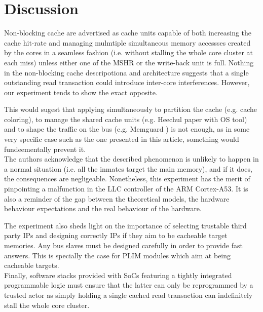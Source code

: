 \section{Discussion}
    Non-blocking cache are advertised as cache units capable of both increasing the cache hit-rate and managing mulmtiple simultaneous memory accessses created by the cores in a seamless fashion (i.e. without stalling the whole core cluster at each miss) unless either one of the MSHR or the write-back unit  is full. Nothing in the non-blocking cache descripotiona and architecture suggests that a single outstanding read transaction could introduce inter-core interferences. However, our experiment tends to show the exact opposite.

    This would sugest that applying simultaneously to partition the cache (e.g. cache coloring), to manage the shared cache units (e.g. Heechul paper with OS tool\cite{}) and to shape the traffic on the bus (e.g. Memguard \cite{}) is not enough, as in some very specific case such as the one presented in this article, something would fundeementally prevent it.\\

    The authors acknowledge that the described phenomenon is unlikely to happen in a normal situation (i.e. all the inmates target the main memory), and if it does, the consequences are negligeable. Nonetheless, this experiment has the merit of pinpointing a malfunction in the LLC controller of the ARM Cortex-A53. It is also a reminder of the gap between the theoretical models, the hardware behaviour expectations and the real behaviour of the hardware.

     The experiment also sheds light on the importance of selecting trustable third party IPs and designing correctly IPs if they aim to be cacheable target memories. Any bus slaves must be designed carefully in order to provide fast answers. This is specially the case for PLIM modules which aim at being cacheable targets.\\

     Finally, software stacks provided with SoCs featuring a tightly integrated programmable logic must ensure that the latter can only be reprogrammed by a trusted actor as simply holding a single cached read transaction can indefinitely stall the whole core cluster.
